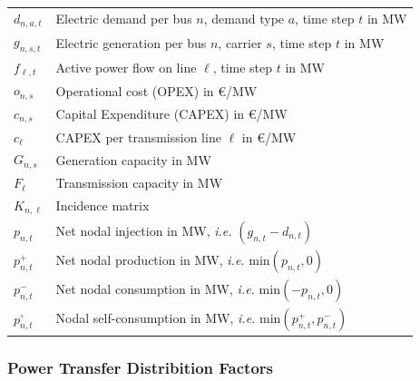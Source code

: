 \documentclass[11pt]{article}
\newcommand{\ie}{\textit{i.e.} }
\newcommand{\vpad}{\vspace{1mm}}
\newcommand{\generation}[1][n]{g_{#1,s,t}}
\newcommand{\generationnodal}[1][n]{g_{#1,t}}
\newcommand{\capacityGeneration}{G_{n,s}}
\newcommand{\capacityFlow}{F_{\ell}}
\newcommand{\capexGeneration}{c_{n,s}}
\newcommand{\capexFlow}{c_{\ell}}
\newcommand{\opexGeneration}[1][n]{o_{#1,s}}
\newcommand{\demand}[1][n]{d_{#1,a,t}}
\newcommand{\demandnodal}[1][n]{d_{#1,t}}
\newcommand{\incidence}[1][n]{K_{#1,\ell}}
\newcommand{\flow}{f_{\ell,t}}
\newcommand{\injection}{p_{n,t}}
\newcommand{\netconsumption}[1][n]{p^{-}_{#1,t}}
\newcommand{\netproduction}[1][n]{p^{+}_{#1,t}}
\newcommand{\selfconsumption}[1][n]{p^{\circ}_{#1,t}}
\begin{document}
\begin{table}[h]
	\centering
	\begin{tabular}{ll}
        $\demand$ & Electric demand per bus $n$, demand type $a$, time step $t$ in MW  \vpad \\
        $\generation$ & Electric generation per bus $n$, carrier $s$, time step $t$  in MW \vpad \\
        $\flow$ & Active power flow on line $\ell$, time step $t$ in MW   \vpad \\
        $\opexGeneration$ & Operational cost (OPEX) in \euro/MW \vpad \\
        $\capexGeneration$ & Capital Expenditure (CAPEX) in \euro/MW \vpad \\
        $\capexFlow$  & CAPEX per transmission line $\ell$ in \euro/MW  \vpad \\
        $\capacityGeneration$ & Generation capacity in MW \vpad \\
        $\capacityFlow$ & Transmission capacity in MW \vpad \\
        $\incidence$ & Incidence matrix \vpad \\
        $\injection$ & Net nodal injection in MW, \ie $\left( \generationnodal - \demandnodal \right)$  \vpad \\
        $\netproduction$ & Net nodal production in MW, \ie $\text{min}\left( \injection, 0 \right)$ \vpad \\
        $\netconsumption$ & Net nodal consumption in MW, \ie $\text{min}\left( - \injection, 0 \right)$ \vpad \\ 
        $\selfconsumption$ & Nodal self-consumption in MW, \ie $\text{min}\left( \netproduction, \netconsumption \right)$
	\end{tabular}
\end{table}




\subsubsection*{Power Transfer Distribition Factors}
\end{document}
